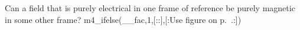 Can a field that is purely electrical in one frame of reference be purely
magnetic in some other frame?
m4_ifelse(__fac,1,[::],[:Use figure  on p.~\pageref{fig:e-b-lorentz}.:])
